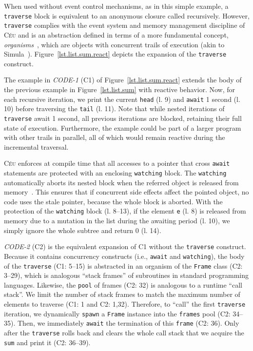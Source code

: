 \documentclass{sig-alternate}
\newcommand{\CEU}{\textsc{C\'{e}u}\xspace}
\newcommand{\code}[1] {{\small{\texttt{#1}}}}
\newcommand{\MM}[1] {\textcircled{\tiny{\textsf{#1}}}}
\begin{document}
When used without event control mechanisms, as in this simple example, a 
\code{traverse} block is equivalent to an anonymous closure called recursively.
%
However, \code{traverse} complies with the event system and memory management 
discipline of \CEU and is an abstraction defined in terms of a more fundamental 
concept, \emph{organisms}~\cite{ceu.mod15}, which are objects with concurrent 
trails of execution (akin to Simula~\cite{simula}).
%
Figure~\ref{lst.list.sum.react} depicts the expansion of the \code{traverse} 
construct.

The example in \emph{CODE-1} (\MM{C1}) of Figure~\ref{lst.list.sum.react} 
extends the body of the previous example in Figure~\ref{lst.list.sum} with 
reactive behavior.
%
Now, for each recursive iteration, we print the current \code{head} (l. 9) 
and \code{await} 1 second (l. 10) before traversing the \code{tail} (l. 
11).
%
Note that while nested iterations of \code{traverse} await 1 second, all 
previous iterations are blocked, retaining their full state of execution.
Furthermore, the example could be part of a larger program with other trails in 
parallel, all of which would remain reactive during the incremental traversal.

\CEU enforces at compile time that all accesses to a pointer that cross 
\code{await} statements are protected with an enclosing \code{watching} block.
%
The \code{watching} automatically aborts its nested block when the referred 
object is released from memory~\cite{ceu.mod15}.
%
This ensures that if concurrent side effects affect the pointed object, no code 
uses the stale pointer, because the whole block is aborted.
%
With the protection of the \code{watching} block (l. 8--13), if the element 
\code{e} (l. 8) is released from memory due to a mutation in the list during 
the awaiting period (l. 10), we simply ignore the whole subtree and return 0 
(l. 14).

\emph{CODE-2} (\MM{C2}) is the equivalent expansion of \MM{C1} without the 
\code{traverse} construct.
%
Because it contains concurrency constructs (i.e., \code{await} and 
\code{watching}), the body of the \code{traverse} (\MM{C1}: 5--15) is 
abstracted in an organism of the \code{Frame} class (\MM{C2}: 3--29), which is 
analogous ``stack frames'' of subroutines in standard programming languages.
Likewise, the \code{pool} of frames (\MM{C2}: 32) is analogous to a runtime 
``call stack''.
We limit the number of stack frames to match the maximum number of elements to 
traverse (\MM{C1}: 1 and \MM{C2}: 1,32).
Therefore, to ``call'' the first \code{traverse} iteration, we dynamically 
\code{spawn} a \code{Frame} instance into the \code{frames} pool (\MM{C2}: 
34--35).
Then, we immediately \code{await} the termination of this \code{frame} 
(\MM{C2}: 36).
Only after the \code{traverse} rolls back and clears the whole call stack
that we acquire the \code{sum} and print it (\MM{C2}: 36--39).
\end{document}
